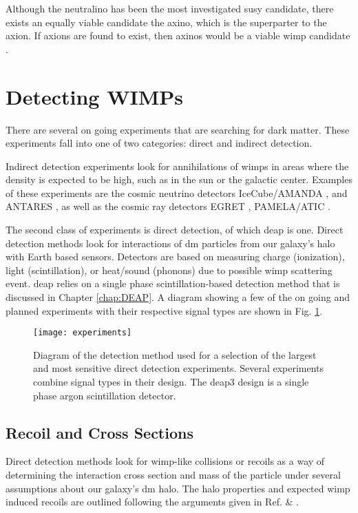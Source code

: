 Although the neutralino has been the most investigated \gls{susy} candidate, there exists an equally viable candidate the axino, which is the superparter to the axion. If axions are found to exist, then axinos would be a viable \gls{wimp} candidate \cite{particlDarkMatterReview}.


\section{Detecting WIMPs}
There are several on going experiments that are searching for dark matter. These experiments fall into one of two categories: direct and indirect detection. 

Indirect detection experiments look for annihilations of \gls{wimp}s in areas where the density is expected to be high, such as in the sun or the galactic center. Examples of these experiments are the cosmic neutrino detectors IceCube/AMANDA \cite{AMANDAandIceCube}, and ANTARES \cite{2013antares}, as well as the cosmic ray detectors EGRET \cite{EGRET}, PAMELA/ATIC \cite{Pamela}.

The second class of experiments is direct detection, of which \gls{deap} is one. Direct detection methods look for interactions of \gls{dm} particles from our galaxy's halo with Earth based sensors. Detectors are based on measuring charge (ionization), light (scintillation), or heat/sound (phonons) due to possible \gls{wimp} scattering event. \gls{deap} relies on a single phase scintillation-based detection method that is discussed in Chapter \ref{chap:DEAP}. A diagram showing a few of the on going and planned experiments with their respective signal types are shown in Fig. \ref{Fig:experiments}.

\begin{figure}
\centering
\texttt{[image: experiments]}
\caption{Diagram of the detection method used for a selection of the largest and most sensitive direct detection experiments. Several experiments combine signal types in their design. The \gls{deap3} design is a single phase argon scintillation detector.}
\label{Fig:experiments}
\end{figure}


\subsection{Recoil and Cross Sections}

Direct detection methods look for \gls{wimp}-like collisions or recoils as a way of determining the interaction cross section and mass of the particle under several assumptions about our galaxy's \gls{dm} halo. The halo properties and expected \gls{wimp} induced recoils are outlined following the arguments given in Ref. \cite{introToDMExperiments} $\&$ \cite{jungman1996supersymmetric}.

